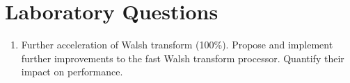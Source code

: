 
\section{Laboratory Questions}
\begin{enumerate}
\item Further acceleration of Walsh transform (100\%). 
Propose and implement further improvements to the fast Walsh
transform processor. Quantify their impact on performance.

\end{enumerate}

